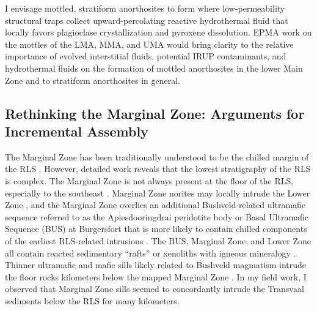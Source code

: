 I envisage mottled, stratiform anorthosites to form where
low-permeability structural traps collect upward-percolating reactive
hydrothermal fluid that locally favors plagioclase crystallization and
pyroxene dissolution. EPMA work on the mottles of the LMA, MMA, and UMA
would bring clarity to the relative importance of evolved interstitial
fluids, potential IRUP contaminants, and hydrothermal fluids on the
formation of mottled anorthosites in the lower Main Zone and to
stratiform anorthosites in general.

\subsection{Rethinking the Marginal Zone: Arguments for Incremental Assembly}
\label{sec:ch5-marginal-zone-rethink}

The Marginal Zone has been traditionally understood to be the chilled
margin of the RLS \citep{harmer1985}. However, detailed work
reveals that the lowest stratigraphy of the RLS is complex. The Marginal
Zone is not always present at the floor of the RLS, especially to the
southeast \citep{molyneux2008,vandermerwe2007,latypov2020}.
Marginal Zone norites may locally intrude the Lower Zone \citep{wilson2017,yudovskaya2021}, and the Marginal Zone overlies an
additional Bushveld-related ultramafic sequence referred to as the
Apiesdooringdrai peridotite body or Basal Ultramafic Sequence (BUS) at
Burgersfort that is more likely to contain chilled components of the
earliest RLS-related intrusions \citep{wilson2012,wilson2017}. The
BUS, Marginal Zone, and Lower Zone all contain reacted sedimentary
``rafts'' or xenoliths with igneous mineralogy \citep{yudovskaya2021}.
Thinner ultramafic and mafic sills likely related to Bushveld
magmatism intrude the floor rocks kilometers below the mapped Marginal
Zone \citep{sharpehulbert1985}. In my field work, I observed that
Marginal Zone sills seemed to concordantly intrude the Transvaal
sediments below the RLS for many kilometers.

